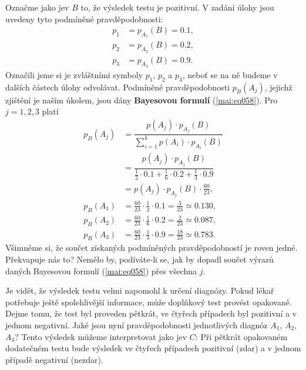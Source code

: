 \begin{mdframed}[style=mdexam]
\begin{example}
    Označme jako jev \(B\) to, že výsledek testu je pozitivní. V zadání úlohy jsou uvedeny tyto
    podmíněné pravděpodobnosti:
    \begin{align*}
      p_1 &= p_{A_1}(B) = \num{0.1}, \\
      p_2 &= p_{A_2}(B) = \num{0.2}, \\ 
      p_3 &= p_{A_3}(B) = \num{0.9}.
    \end{align*}
    Označili jsme si je zvláštními symboly \(p_1\), \(p_2\) a \(p_3\), neboť se na ně budeme v
    dalších částech úlohy odvolávat. Podmíněné pravděpodobnosti \(p_B(A_j)\), jejichž zjištění je
    naším úkolem, jsou dány \textbf{Bayesovou formulí} (\ref{mai:eq058}). Pro \(j= 1, 2, 3\) platí
    \begin{align*}
      p_B(A_j) &= \dfrac{p(A_j)\cdot p_{A_j}(B)}{\sum_{i=1}^{k}p(A_i)\cdot p_{A_i}(B)}  \\
               &= \dfrac{p(A_j)\cdot p_{A_j}(B)}{\frac{1}{2}\cdot\num{0.1} + 
                                                \frac{1}{6}\cdot\num{0.2} + 
                                                \frac{1}{3}\cdot\num{0.9}}              \\
               &= p(A_j)\cdot p_{A_j}(B)\cdot\frac{60}{23},                             \\
      p_B(A_1) &= \frac{60}{23} \cdot\frac{1}{2}\cdot\num{0.1}                   
                = \frac{3}{23}\simeq\num{0.130},                                        \\
      p_B(A_2) &= \frac{60}{23} \cdot\frac{1}{6}\cdot\num{0.2}                   
                = \frac{2}{23}\simeq\num{0.087},                                        \\
      p_B(A_3) &= \frac{60}{23} \cdot\frac{1}{3}\cdot\num{0.9}                   
                = \frac{18}{23}\simeq\num{0.783}.
    \end{align*}
    Všimněme si, že součet získaných podmíněných pravděpodobností je roven jedné. Překvapuje nás to?
    Nemělo by, podíváte-li se, jak by dopadl součet výrazů daných Bayesovou formulí
    (\ref{mai:eq058}) přes všechna \(j\).
    
    Je vidět, že výsledek testu velmi napomohl k určení diagnózy. Pokud lékař potřebuje ještě
    spolehlivější informace, může doplňkový test provést opakovaně. Dejme tomu, že test byl proveden
    pětkrát, ve čtyřech případech byl pozitivní a v jednom negativní. Jaké jsou nyní
    pravděpodobnosti jednotlivých diagnóz \(A_1\), \(A_2\), \(A_3\)? Tento výsledek můžeme
    interpretovat jako jev \(C\): Při pětkrát opakovaném dodatečném testu bude výsledek ve čtyřech
    případech pozitivní (zdar) a v jednom případě negativní (nezdar).
    

\end{example}
\end{mdframed}
